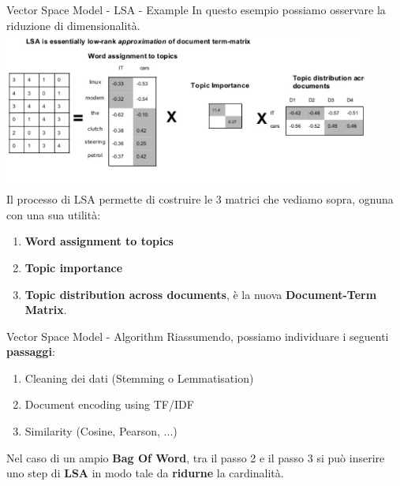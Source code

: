 \documentclass[british]{beamer}
\begin{document}
\begin{frame}{Vector Space Model - LSA - Example}
	In questo esempio possiamo osservare la riduzione di dimensionalit\`{a}.
	\includegraphics[width=0.9\textwidth, height=0.5
	\textheight]{./Imgs/LSA2}\\
	Il processo di LSA permette di costruire le 3 matrici che vediamo sopra, ognuna con una sua utilit\`{a}:
	\begin{enumerate}
		\item \textbf{Word assignment to topics}
		\item \textbf{Topic importance}
		\item \textbf{Topic distribution across documents}, \`{e} la nuova \textbf{Document-Term Matrix}.
	\end{enumerate}
\end{frame}

\begin{frame}{Vector Space Model - Algorithm}
	Riassumendo, possiamo individuare i seguenti \textbf{passaggi}:
	\begin{enumerate}
		\item Cleaning dei dati (Stemming o Lemmatisation)
		\item Document encoding using TF/IDF
		\item Similarity (Cosine, Pearson, ...)
	\end{enumerate}
	Nel caso di un ampio \textbf{Bag Of Word}, tra il passo 2 e il passo 3 si pu\`{o} inserire uno step di \textbf{LSA} in modo tale da \textbf{ridurne} la cardinalit\`{a}.
\end{frame}
\end{document}
